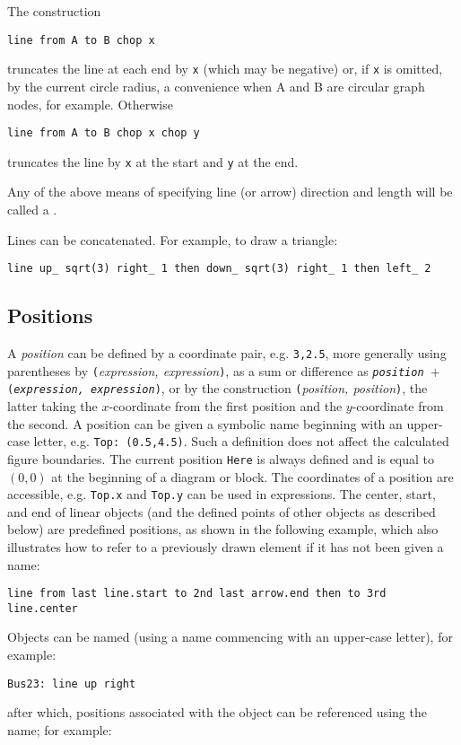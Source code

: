 The construction

{\tt line from A to B chop x}

\noindent
truncates the line at each end by {\tt x} (which may be negative)
or, if {\tt x} is omitted, by
the current circle radius, a convenience when A and B are
circular graph nodes, for example.  Otherwise

{\tt line from A to B chop x chop y}

\noindent
truncates the line by {\tt x} at the start and {\tt y} at the end.

Any of the above means of specifying line (or arrow) direction and length
will be called a \linespec.

Lines can be concatenated.  For example, to draw a triangle:

{\tt line up\_ sqrt(3) right\_ 1 then down\_ sqrt(3) right\_ 1 then left\_ 2}

\subsection{Positions\label{Positions:}}
A {\sl position} can be defined by a coordinate pair, e.g. {\tt 3,2.5},
more generally using parentheses by {\tt (}{\sl expression, expression}{\tt )},
as a sum or difference as
{\tt{\sl position} $+$ ({\sl expression, expression})},
or by the construction {\tt (}{\sl position, position}{\tt )},
the latter taking the $x$-coordinate from the first
position and the $y$-coordinate from the second.  A position can be
given a symbolic name beginning with an upper-case letter,
e.g. {\tt Top:~(0.5,4.5)}.  Such a definition does not affect the calculated
figure boundaries.  The current position {\tt Here} is always defined and
is equal to $(0,0)$ at the beginning of a diagram or block.
The coordinates of a position are accessible, e.g. {\tt Top.x} and
{\tt Top.y} can be used in expressions.  The center, start, and end of
linear objects (and the defined points of other objects as described below)
are predefined positions, as shown in the following example,
which also illustrates how to refer to a previously drawn element if it has
not been given a name:

{\tt line from last line.start to 2nd last arrow.end then to 3rd line.center}

Objects can be named (using a name commencing with an upper-case letter),
for example:

{\tt Bus23: line up right}

\noindent
after which, positions associated with the object can be referenced using the
name; for example:

